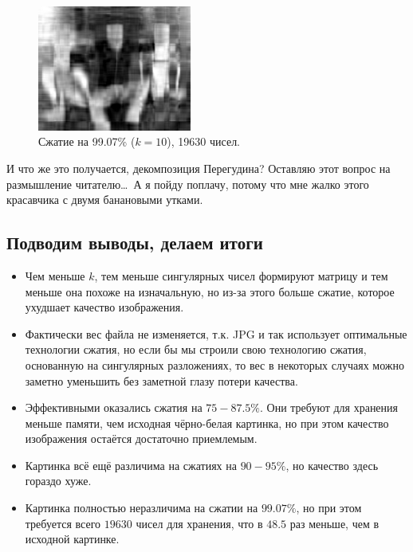 \documentclass[a3paper,14pt]{extarticle}
\begin{document}
\begin{figure}[H]
    \begin{center}
        \includegraphics[width=0.45\textwidth]{banana ducks_10.jpg}
        \caption{Сжатие на 99.07\% ($k=10$), 19630 чисел.}
    \end{center}
\end{figure}
\noindent И что же это получается, декомпозиция Перегудина? Оставляю этот вопрос на размышление читателю\dots\ А я пойду поплачу, потому что мне жалко этого красавчика с двумя банановыми утками.
\subsection*{\centering Подводим выводы, делаем итоги}
\begin{itemize}
    \item Чем меньше $k$, тем меньше сингулярных чисел формируют матрицу и тем меньше она похоже на изначальную, но из-за этого больше сжатие, которое ухудшает качество изображения.
    \item Фактически вес файла не изменяется, т.к. JPG и так использует оптимальные технологии сжатия, но если бы мы строили свою технологию сжатия, основанную на сингулярных разложениях, то вес в некоторых случаях можно заметно уменьшить без заметной глазу потери качества.
    \item Эффективными оказались сжатия на $75-87.5\%$. Они требуют для хранения меньше памяти, чем исходная чёрно-белая картинка, но при этом качество изображения остаётся достаточно приемлемым.
    \item Картинка всё ещё различима на сжатиях на $90-95\%$, но качество здесь гораздо хуже.
    \item Картинка полностью неразличима на сжатии на $99.07\%$, но при этом требуется всего $19630$ чисел для хранения, что в $48.5$ раз меньше, чем в исходной картинке.
\end{itemize}
\end{document}
